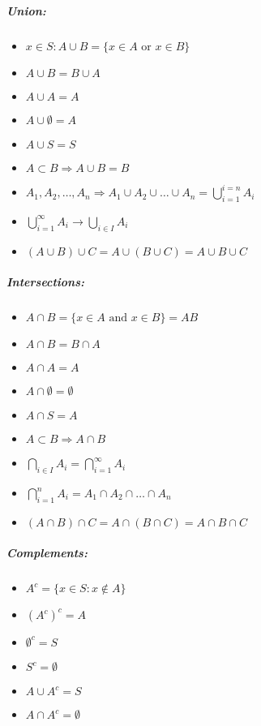 \documentclass[landscape,10pt]{article}
\begin{document}
    \footnotesize
    \begin{multicols}{3}
    \setlength{\premulticols}{1pt}
    \setlength{\postmulticols}{1pt}
    \setlength{\multicolsep}{1pt}
    \setlength{\columnsep}{2pt}

    \subparagraph*{Union: } 
        \begin{itemize}[noitemsep]
            \item[] $x \in S: A \cup B= \{x \in A \text{ or } x \in B\}$
            \item[] $A \cup B = B \cup A$
            \item[] $A \cup A = A$
            \item[] $A \cup \emptyset = A$
            \item[] $A \cup S = S $
            \item[] $A \subset B \Rightarrow A \cup B = B$
            \item[] $A_1, A_2, \dots, A_n \Rightarrow A_1 \cup A_2 \cup \dots \cup A_n = \bigcup\limits_{i=1}^{i=n} A_i$
            \item[] $\bigcup\limits_{i=1}^{\infty} A_i \rightarrow \bigcup\limits_{i\in I}A_i$
            \item[] $(A \cup B) \cup C = A \cup (B \cup C) = A \cup B \cup C $
        \end{itemize}

    \subparagraph*{Intersections: }             
        \begin{itemize}[noitemsep]
            \item[] \( A \cap B = \{ x \in A \text{ and } x \in B\} = AB \)
            \item[] \(A \cap B = B \cap A \)
            \item[] \(A \cap A = A \)
            \item[] \(A \cap \emptyset = \emptyset \)
            \item[] \(A \cap S = A\)
            \item[] \(A \subset B \Rightarrow A \cap B\)
            \item[] \(\bigcap\limits_{i\in I}A_i = \bigcap\limits_{i=1}^{\infty}A_i\)
            \item[] \(\bigcap\limits_{i=1}^{n}A_i = A_1 \cap A_2 \cap \dots \cap A_n \)
            \item[] \( (A \cap B) \cap C = A \cap (B \cap C) = A \cap B \cap C\)
        \end{itemize}

    \subparagraph*{Complements: } 
        \begin{itemize}[noitemsep]
            \item[] \(A^c = \{x \in S: x \notin A\}\)
            \item[] \((A^c)^c = A\)
            \item[] \(\emptyset^c = S\)
            \item[] \(S^c = \emptyset\)
            \item[] \(A\cup A^c = S\)
            \item[] \(A \cap A^c = \emptyset\)
        \end{itemize}


\end{multicols}
\end{document}
